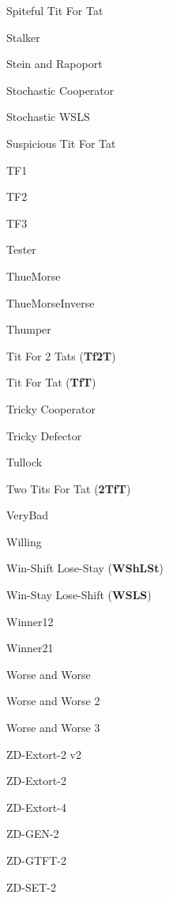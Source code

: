 \item Spiteful Tit For Tat~\cite{prison}
\item Stalker~\cite{Carvalho2013}
\item Stein and Rapoport~\cite{Axelrod1980a}
\item Stochastic Cooperator~\cite{Adami2013}
\item Stochastic WSLS~\cite{axelrodproject}
\item Suspicious Tit For Tat~\cite{Beaufils1997, Hilbe2013}
\item TF1~\cite{axelrodproject}
\item TF2~\cite{axelrodproject}
\item TF3~\cite{axelrodproject}
\item Tester~\cite{Axelrod1980b}
\item ThueMorse~\cite{axelrodproject}
\item ThueMorseInverse~\cite{axelrodproject}
\item Thumper~\cite{Ashlock2008}
\item Tit For 2 Tats (\textbf{Tf2T})~\cite{Axelrod1981}
\item Tit For Tat (\textbf{TfT})~\cite{Axelrod1980a}
\item Tricky Cooperator~\cite{axelrodproject}
\item Tricky Defector~\cite{axelrodproject}
\item Tullock~\cite{Axelrod1980a}
\item Two Tits For Tat (\textbf{2TfT})~\cite{Axelrod1981}
\item VeryBad~\cite{Andre2013}
\item Willing \cite{Van2015}
\item Win-Shift Lose-Stay (\textbf{WShLSt})~\cite{Li2011}
\item Win-Stay Lose-Shift (\textbf{WSLS})~\cite{Kraines1989, Nowak1993, Stewart2012}
\item Winner12~\cite{mathieu2017}
\item Winner21~\cite{mathieu2017}
\item Worse and Worse\cite{prison}
\item Worse and Worse 2\cite{prison}
\item Worse and Worse 3\cite{prison}
\item ZD-Extort-2 v2~\cite{Kuhn2017}
\item ZD-Extort-2~\cite{Stewart2012}
\item ZD-Extort-4~\cite{axelrodproject}
\item ZD-GEN-2~\cite{Kuhn2017}
\item ZD-GTFT-2~\cite{Stewart2012}
\item ZD-SET-2~\cite{Kuhn2017}